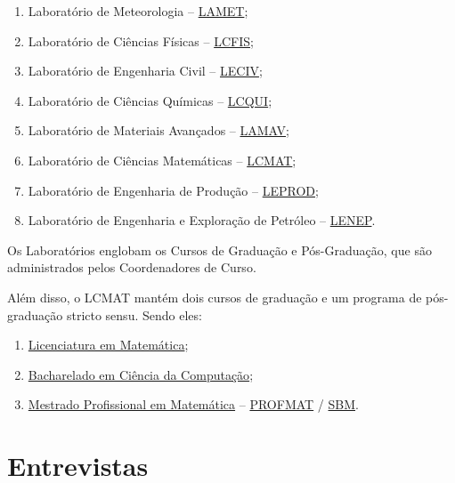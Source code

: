     \begin{enumerate}
        \item Laboratório de Meteorologia – \href{https://uenf.br/cct/administracao/laboratorios/}{LAMET};
        \item Laboratório de Ciências Físicas – \href{https://uenf.br/cct/lcmat/}{LCFIS};
        \item Laboratório de Engenharia Civil – \href{https://uenf.br/cct/administracao/laboratorios/}{LECIV};
        \item Laboratório de Ciências Químicas – \href{https://uenf.br/cct/administracao/laboratorios/}{LCQUI};
        \item Laboratório de Materiais Avançados – \href{https://uenf.br/cct/administracao/laboratorios/}{LAMAV};
        \item Laboratório de Ciências Matemáticas – \href{https://uenf.br/cct/administracao/laboratorios/}{LCMAT};
        \item Laboratório de Engenharia de Produção – \href{https://uenf.br/cct/administracao/laboratorios/}{LEPROD};
        \item Laboratório de Engenharia e Exploração de Petróleo – \href{https://uenf.br/cct/administracao/laboratorios/}{LENEP}.
    \end{enumerate}

    Os Laboratórios englobam os Cursos de Graduação e Pós-Graduação, que são administrados pelos Coordenadores de Curso.

    Além disso, o LCMAT mantém dois cursos de graduação e um programa de pós-graduação stricto sensu. Sendo eles:
    
    \begin{enumerate}
        \item \href{https://uenf.br/posgraduacao/licenciatura-matematica/}{Licenciatura em Matemática};
        \item \href{https://cc.uenf.br/}{Bacharelado em Ciência da Computação};
        \item \href{https://uenf.br/posgraduacao/matematica/apresentacao/}{Mestrado Profissional em Matemática} – \href{https://uenf.br/posgraduacao/programas/pos-graduacao-stricto-sensu/}{PROFMAT} / \href{https://www.profmat-sbm.org.br/}{SBM}.
    \end{enumerate}

\section{Entrevistas} %

